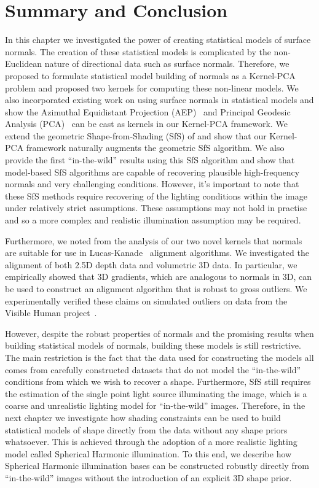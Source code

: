 \section{Summary and Conclusion}\label{sec:singl_img_summary}
In this chapter we investigated the power of creating statistical models
of surface normals. The creation of these statistical models is complicated
by the non-Euclidean nature of directional data such as surface normals.
Therefore, we proposed to formulate statistical model building of normals
as a Kernel-PCA problem and proposed two kernels for computing these non-linear
models. We also incorporated existing work on using surface normals in
statistical models and show the
Azimuthal Equidistant Projection (AEP)~\cite{smith2006recovering} and
Principal Geodesic Analysis (PCA)~\cite{smith2008facial} can be cast as
kernels in our Kernel-PCA framework. We extend the geometric
Shape-from-Shading (SfS) of \citet{smith2006recovering} and show that our
Kernel-PCA framework naturally augments the geometric SfS algorithm. We also
provide the first ``in-the-wild'' results using this SfS algorithm and show
that model-based SfS algorithms are capable of recovering plausible high-frequency
normals and very challenging conditions. However, it's important
to note that these SfS methods require recovering of the lighting
conditions within the image under relatively strict assumptions. These
assumptions may not hold in practise and so a more complex and realistic
illumination assumption may be required.

Furthermore, we noted from the analysis of our two novel kernels that normals
are suitable for use in Lucas-Kanade~\cite{lucas1981iterative} alignment
algorithms. We investigated the alignment of both 2.5D depth data and volumetric
3D data. In particular, we empirically showed that 3D gradients, which are
analogous to normals in 3D, can be used to construct an alignment algorithm
that is robust to gross outliers. We experimentally verified these claims
on simulated outliers on data from the
Visible Human project~\cite{spitzer1996visiblehuman}.

However, despite the robust properties of normals and the promising results
when building statistical models of normals, building these models is still
restrictive. The main restriction is the fact that the data used
for constructing the models all comes from carefully constructed datasets
that do not model the ``in-the-wild'' conditions from which we wish to recover
a shape. Furthermore, SfS still requires the estimation of the single point light
source illuminating the image, which is a coarse and unrealistic lighting
model for ``in-the-wild'' images. Therefore, in the next chapter we investigate
how shading constraints can be used to build statistical models of shape
directly from the data without any shape priors whatsoever. This is achieved
through the adoption of a more realistic lighting model called Spherical
Harmonic illumination. To this end, we describe how Spherical Harmonic illumination
bases can be constructed robustly directly from ``in-the-wild'' images
without the introduction of an explicit 3D shape prior.
